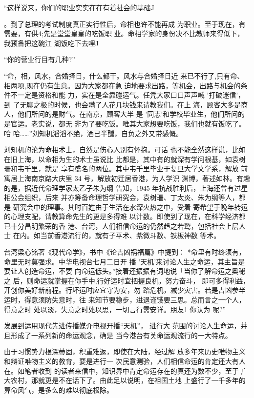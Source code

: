 “这样说来，你们的职业实实在在有着社会的基础J

。到了总理的考试制度真正实行性后，命相也许不能再成
为职业。至于现在，有需要，有供4;先是堂堂皇皇的吃饭职
业。命相学家的身份决不比教师来得低下，我预备把这碗江
湖饭吃下去哩J

“你的营业行目有几种?”

“命，相，风水，合婚择日，什么都干。风水与合婚择日近
来已不行了,只有命、相两项,现在仍有生意。因为大家都在急
迫地要求出路，等机会，出路与机会的条件不一定是资格和能
力，实在是全靠碰运气。任凭大家口口声声喊 '打破迷信'，到
了无聊之极的时候，也会瞒了人花几块钱来请教我们。在上
海，顾客大多是商人，他们所问的是财气。在南京，顾客大半
是 '同志'和学校毕业生，他们所问的是官运。老实说，都无
非为了要吃饭。唯其大家想要吃饭，我们也就有饭吃了。哈
哈……”刘知机滔滔不绝，酒已半醺，自负之外又带感慨。

刘知机的沦为命相术士，自然是伤心人别有怀抱。可话
也不能全然这样说，比如在旧上海，以命相为生的术士虽说比
比都是，其中有的就深有学问根基，如袁树珊和韦千里，就是
享有盛名的两位。其中韦千里毕业于复旦大学文学系，解放
前寓居上海南京路大庆里 34 号，解放初迁居香港，为人学识
渊博，著述如林。有趣的是，据近代命理学家太乙子朱为纲
告知，1945 年抗战胜利后，上海还曾有过星相公会组织，后来
并亦筹备命理哲学研究会，袁树珊、丁太炎、朱为纲等人，都是
研究会中的理事。其时百姓由于生活在水深火热之中，受着
寄希望于晚年转运的心理支配，请教算命先生的更是多得难
以计数。即使到了现在，在科学经济都已十分昌明繁荣的香
港、台湾，人们相信命运的仍然趋之若鹫，包括社会上层人士
在内。如当前香港流行的，就有子平术、紫微斗数、铁板神数
等术。 

台湾梁心铭著《现代命学》，书中《论吉凶祸福篇》中提到：
*命里有时终须有，命里无时莫强求。中华电视台七月二日开
播 '天机'来讨论人生之命运，其主旨是要让人创造命运，不要
向命运低头。”接着还振振有词地说「当你了解命运之奥秘之
后，则命运就掌握在你手中,行好运时宜把握良机，努力奋斗，
即可多得利益，开创你美好新前程。行坏运时应宜守为安，勿
踏危机，减少灾害。若是吉凶参半运时，得意须防失意时，往
来知节要稳步，进退谨饿要三思。总而言之一个人，得意之时
处以淡，失意之时处以思，一切言行需安详。朋友1 你认为
呢?”

发展到运用现代先进传播媒介电视开播“天机”， 进行大
范围的讨论人生命运，并且形成了一系列新的命运观念，确是
当今港台有关命运观流行的一大特点。

由于习惯势力根深蒂固，积重难返，即使在大陆，经过解
放多年来历史唯物主义和辩证唯物主义的教育，要是进行一
次民意测验，人们相信命运的肯定还大有人在。如笔者收到
的读者来信中，知识界中肯定命运存在的真还为数不少，至于
广大农村，那就更是不在话下了。由此足以说明，在祖国土地
上盛行了一千多年的算命风气，是多么的难以彻底根除。

